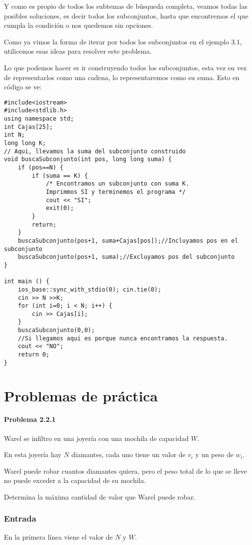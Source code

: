Y como es propio de todos los subtemas de búsqueda completa, veamos todas las posibles soluciones, es decir todos los subconjuntos, hasta que encontremos el que cumpla la condición o nos quedemos sin opciones.

Como ya vimos la forma de iterar por todos los subconjuntos en el ejemplo 3.1, utilicemos esas ideas para resolver este problema.

Lo que podemos hacer es ir construyendo todos los subconjuntos, esta vez en vez de representarlos como una cadena, lo representaremos como su suma. Esto en código se ve:
\newpage
\begin{lstlisting}
#include<iostream>
#include<stdlib.h>
using namespace std;
int Cajas[25];
int N;
long long K;
// Aqui, llevamos la suma del subconjunto construido
void buscaSubconjunto(int pos, long long suma) {
	if (pos==N) {
		if (suma == K) {
			/* Encontramos un subconjunto con suma K.
			Imprimmos SI y terminemos el programa */
			cout << "SI";
			exit(0);
		}
		return;
	}
	buscaSubconjunto(pos+1, suma+Cajas[pos]);//Incluyamos pos en el subconjunto
	buscaSubconjunto(pos+1, suma);//Excluyamos pos del subconjunto	
}

int main () {
	ios_base::sync_with_stdio(0); cin.tie(0);
	cin >> N >>K;
	for (int i=0; i < N; i++) {
		cin >> Cajas[i];
	}
	buscaSubconjunto(0,0);
	//Si llegamos aqui es porque nunca encontramos la respuesta.
	cout << "NO";
	return 0;
}
\end{lstlisting}

\newpage
\section*{Problemas de práctica}
\paragraph{Problema 2.2.1} Warel se infiltro en una joyería con una mochila de capacidad \(W\).

En esta joyería hay \(N\) diamantes, cada uno tiene un valor de \(v_i\) y un peso de \(w_i\).

Warel puede robar cuantos diamantes quiera, pero el peso total de lo que se lleve no puede exceder a la capacidad de su mochila.

Determina la máxima cantidad de valor que Warel puede robar.

\subsubsection*{Entrada}
En la primera línea viene el valor de \(N\) y \(W\).


